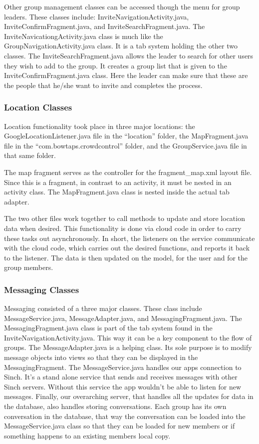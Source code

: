  	Other group management classes can be accessed though the menu for group leaders. These classes include: InviteNavigationActivity.java, InviteConfirmFragment.java, and InviteSearchFragment.java. The InviteNavicationgActivity.java class is much like the GroupNavigationActivity.java class. It is a tab system holding the other two classes. The InviteSearchFragment.java allows the leader to search for other users they wish to add to the group. It creates a group list that is given to the InviteConfirmFragment.java class. Here the leader can make sure that these are the people that he/she want to invite and completes the process.
 	\subsubsection{Location Classes}
 	Location functionality took place in three major locations: the GoogleLocationListener.java file in the ``location'' folder, the MapFragment.java file in the ``com.bowtaps.crowdcontrol'' folder, and the GroupService.java file in that same folder. 
 	
 	The map fragment serves as the controller for the fragment\_map.xml layout file. Since this is a fragment, in contrast to an activity, it must be nested in an activity class. The MapFragment.java class is nested inside the actual tab adapter. 
 	
 	The two other files work together to call methods to update and store location data when desired. This functionality is done via cloud code in order to carry these tasks out asynchronously. In short, the listeners on the service communicate with the cloud code, which carries out the desired functions, and reports it back to the listener. The data is then updated on the model, for the user and for the group members.
 	\subsubsection{Messaging Classes}
 Messaging consisted of a three major classes. These class include MessageService.java, MessageAdapter.java, and MessagingFragment.java. The MessagingFragment.java class is part of the tab system found in the InviteNavigationActivity.java. This way it can be a key component to the flow of groups. The MessageAdapter.java is a helping class. Its sole purpose is to modify message objects into views so that they can be displayed in the MessagingFragment. The MessageService.java handles our apps connection to Sinch. It's a stand alone service that sends and receives messages with other Sinch servers. Without this service the app wouldn't be able to listen for new messages. Finally, our overarching server, that handles all the updates for data in the database, also handles storing conversations. Each group has its own conversation in the database, that way the conversation can be loaded into the MessageService.java class so that they can be loaded for new members or if something happens to an existing members local copy.

